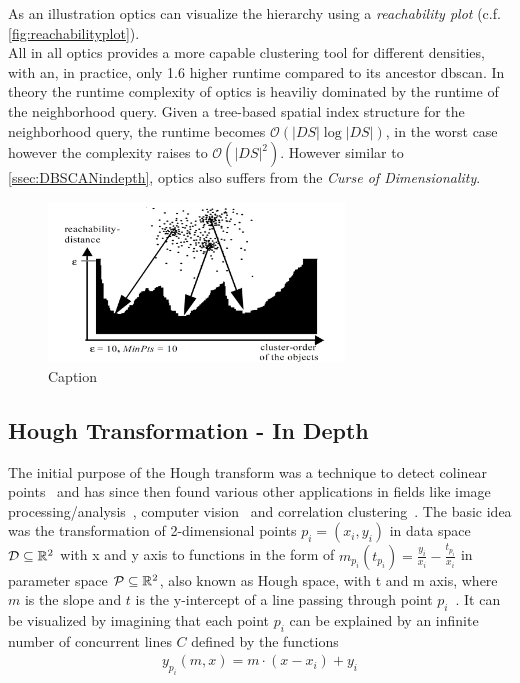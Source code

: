 As an illustration \gls{optics} can visualize the hierarchy using a \textit{reachability plot} (c.f. \autoref{fig:reachabilityplot}).\\

All in all \gls{optics} provides a more capable clustering tool for different densities, with an, in practice, only 1.6 higher runtime compared to its ancestor \gls{dbscan}. In theory the runtime complexity of \gls{optics} is heaviliy dominated by the runtime of the neighborhood query. Given a tree-based spatial index structure for the neighborhood query, the runtime becomes $\mathcal{O}(|DS| \log |DS|)$, in the worst case however the complexity raises to $\mathcal{O}(|DS|^2)$. However similar to \autoref{ssec:DBSCANindepth}, \gls{optics} also suffers from the \textit{Curse of Dimensionality}.

\begin{figure}
    \centering
    \includegraphics[width=0.7\textwidth]{figures/reachabilityplot.png}
    \caption{Caption}
    \label{fig:reachabilityplot}
\end{figure}

\subsection{Hough Transformation - In Depth}\label{ssec:houghindepth}
The initial purpose of the Hough transform was a technique to detect colinear points~\cite{houghOriginal1962method} and has since then found various other applications in fields like image processing/analysis~\cite{rosenfeld1969picture,ballard1981generalizing}, computer vision~\cite{davies2004machine} and correlation clustering~\cite{CASHachtert2008robust}.
The basic idea was the transformation of 2-dimensional points $p_i = (x_i,y_i)$ in data space $\mathcal{D} \subseteq \mathbb{R}^2$ with x and y axis to functions in the form of ${m_{p_i}(t_{p_i}) = \frac{y_i}{x_i} - \frac{t_{p_i}}{x_i}}$ in parameter space $\mathcal{P} \subseteq \mathbb{R}^2$, also known as Hough space, with t and m axis, where $m$ is the slope and $t$ is the y-intercept of a line passing through point $p_i$~\cite{illingworth1988survey}. It can be visualized by imagining that each point $p_i$ can be explained by an infinite number of concurrent lines $C$ defined by the functions 
\begin{align}
    {y_{p_i}(m,x) = m \cdot (x - x_i) + y_i}
\end{align}

